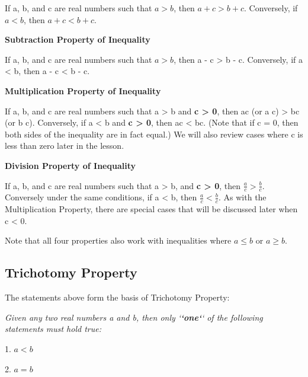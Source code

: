 If a, b, and c are real numbers such that $a > b$, then $a + c > b + c$. Conversely, if $a
< b$, then $a + c < b + c$.



\textbf{Subtraction Property of Inequality}



If a, b, and c are real numbers such that $a > b$, then a - c > b - c. Conversely, if a <
b, then a - c < b - c.



\textbf{Multiplication Property of Inequality}



If a, b, and c are real numbers such that a > b and \textbf{c > 0}, then ac (or a \* c) >
bc (or b \* c). Conversely, if a < b and \textbf{c > 0}, then ac < bc. (Note that if c =
0, then both sides of the inequality are in fact equal.) We will also review cases where c
is less than zero later in the lesson.



\textbf{Division Property of Inequality}



If a, b, and c are real numbers such that a > b, and \textbf{c > 0}, then $\frac {a}{c} >
\frac {b}{c}$. Conversely under the same conditions, if a < b, then $\frac {a} {c} < \frac
{b}{c}$. As with the Multiplication Property, there are special cases that will be
discussed later when c < 0.



Note that all four properties also work with inequalities where $a \le b$ or $a \ge b$.




\subsection{Trichotomy Property}
\label{sss:tric-4c52}




The statements above form the basis of Trichotomy Property:



\textit{Given any two real numbers a and b, then only `\textbf{`one`}` of the following statements must hold true:}



1.  $a < b$

2.  $a = b$

